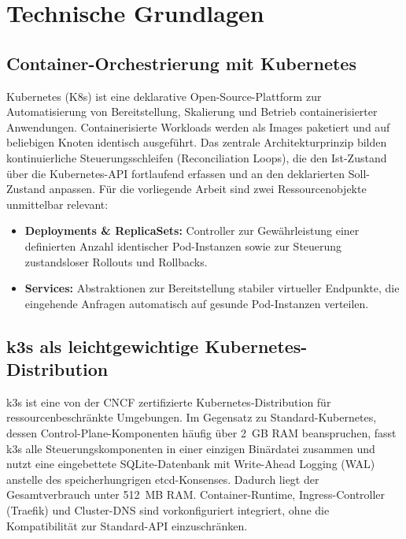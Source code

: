 \chapter{Technische Grundlagen}
\label{chap:technische-grundlagen}

\section{Container-Orchestrierung mit Kubernetes}
\label{sec:container-kubernetes}
Kubernetes (K8s) ist eine deklarative Open-Source-Plattform zur Automatisierung von Bereitstellung, Skalierung und Betrieb containerisierter Anwendungen. Containerisierte Workloads werden als Images paketiert und auf beliebigen Knoten identisch ausgeführt. Das zentrale Architekturprinzip bilden kontinuierliche Steuerungsschleifen (Reconciliation Loops), die den Ist-Zustand über die Kubernetes-API fortlaufend erfassen und an den deklarierten Soll-Zustand anpassen. Für die vorliegende Arbeit sind zwei Ressourcenobjekte unmittelbar relevant:
\begin{itemize}[noitemsep,topsep=2pt]
    \item \textbf{Deployments \& ReplicaSets:} Controller zur Gewährleistung einer definierten Anzahl identischer Pod-Instanzen sowie zur Steuerung zustandsloser Rollouts und Rollbacks.
    \item \textbf{Services:} Abstraktionen zur Bereitstellung stabiler virtueller Endpunkte, die eingehende Anfragen automatisch auf gesunde Pod-Instanzen verteilen.
\end{itemize}

\section{k3s als leichtgewichtige Kubernetes-Distribution}
\label{sec:k3s-grundlagen}
k3s ist eine von der CNCF zertifizierte Kubernetes-Distribution für ressourcenbeschränkte Umgebungen. Im Gegensatz zu Standard-Kubernetes, dessen Control-Plane-Komponenten häufig über 2~GB RAM beanspruchen, fasst k3s alle Steuerungskomponenten in einer einzigen Binärdatei zusammen und nutzt eine eingebettete SQLite-Datenbank mit Write-Ahead Logging (WAL) anstelle des speicherhungrigen etcd-Konsenses. Dadurch liegt der Gesamtverbrauch unter 512~MB RAM. Container-Runtime, Ingress-Controller (Traefik) und Cluster-DNS sind vorkonfiguriert integriert, ohne die Kompatibilität zur Standard-API einzuschränken.

